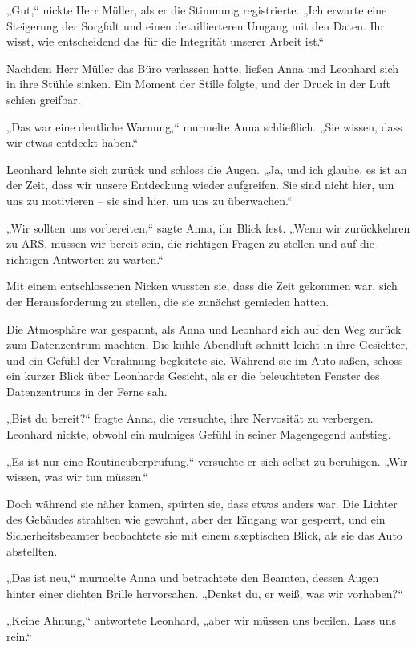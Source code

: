 \documentclass[
]{article}
\begin{document}
„Gut,`` nickte Herr Müller, als er die Stimmung registrierte. „Ich
erwarte eine Steigerung der Sorgfalt und einen detaillierteren Umgang
mit den Daten. Ihr wisst, wie entscheidend das für die Integrität
unserer Arbeit ist.``

Nachdem Herr Müller das Büro verlassen hatte, ließen Anna und Leonhard
sich in ihre Stühle sinken. Ein Moment der Stille folgte, und der Druck
in der Luft schien greifbar.

„Das war eine deutliche Warnung,`` murmelte Anna schließlich. „Sie
wissen, dass wir etwas entdeckt haben.``

Leonhard lehnte sich zurück und schloss die Augen. „Ja, und ich glaube,
es ist an der Zeit, dass wir unsere Entdeckung wieder aufgreifen. Sie
sind nicht hier, um uns zu motivieren -- sie sind hier, um uns zu
überwachen.``

„Wir sollten uns vorbereiten,`` sagte Anna, ihr Blick fest. „Wenn wir
zurückkehren zu ARS, müssen wir bereit sein, die richtigen Fragen zu
stellen und auf die richtigen Antworten zu warten.``

Mit einem entschlossenen Nicken wussten sie, dass die Zeit gekommen war,
sich der Herausforderung zu stellen, die sie zunächst gemieden hatten.

Die Atmosphäre war gespannt, als Anna und Leonhard sich auf den Weg
zurück zum Datenzentrum machten. Die kühle Abendluft schnitt leicht in
ihre Gesichter, und ein Gefühl der Vorahnung begleitete sie. Während sie
im Auto saßen, schoss ein kurzer Blick über Leonhards Gesicht, als er
die beleuchteten Fenster des Datenzentrums in der Ferne sah.

„Bist du bereit?{\kern0pt}`` fragte Anna, die versuchte, ihre Nervosität
zu verbergen. Leonhard nickte, obwohl ein mulmiges Gefühl in seiner
Magengegend aufstieg.

„Es ist nur eine Routineüberprüfung,`` versuchte er sich selbst zu
beruhigen. „Wir wissen, was wir tun müssen.``

Doch während sie näher kamen, spürten sie, dass etwas anders war. Die
Lichter des Gebäudes strahlten wie gewohnt, aber der Eingang war
gesperrt, und ein Sicherheitsbeamter beobachtete sie mit einem
skeptischen Blick, als sie das Auto abstellten.

„Das ist neu,`` murmelte Anna und betrachtete den Beamten, dessen Augen
hinter einer dichten Brille hervorsahen. „Denkst du, er weiß, was wir
vorhaben?{\kern0pt}``

„Keine Ahnung,`` antwortete Leonhard, „aber wir müssen uns beeilen. Lass
uns rein.``
\end{document}
